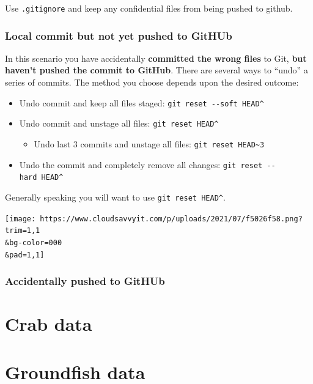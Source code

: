 \documentclass[
]{book}
\providecommand{\tightlist}{%
  \setlength{\itemsep}{0pt}\setlength{\parskip}{0pt}}
\begin{document}
Use \texttt{.gitignore} and keep any confidential files from being pushed to github.

\hypertarget{local-commit-but-not-yet-pushed-to-github}{%
\subsubsection{Local commit but not yet pushed to GitHUb}\label{local-commit-but-not-yet-pushed-to-github}}

In this scenario you have accidentally \textbf{committed the wrong files} to Git, \textbf{but haven't pushed the commit to GitHub}.
There are several ways to ``undo'' a series of commits.
The method you choose depends upon the desired outcome:

\begin{itemize}
\tightlist
\item
  Undo commit and keep all files staged: \texttt{git\ reset\ -\/-soft\ HEAD\^{}}
\item
  Undo commit and unstage all files: \texttt{git\ reset\ HEAD\^{}}

  \begin{itemize}
  \tightlist
  \item
    Undo last 3 commits and unstage all files: \texttt{git\ reset\ HEAD\textasciitilde{}3}
  \end{itemize}
\item
  Undo the commit and completely remove all changes: \texttt{git\ reset\ -\/-hard\ HEAD\^{}}
\end{itemize}

Generally speaking you will want to use \texttt{git\ reset\ HEAD\^{}}.

\texttt{[image: https://www.cloudsavvyit.com/p/uploads/2021/07/f5026f58.png?trim=1,1\\\&bg-color=000\\\&pad=1,1]}

\hypertarget{accidentally-pushed-to-github}{%
\subsubsection{Accidentally pushed to GitHUb}\label{accidentally-pushed-to-github}}

\hypertarget{crab-data}{%
\section{Crab data}\label{crab-data}}

\hypertarget{groundfish-data}{%
\section{Groundfish data}\label{groundfish-data}}
\end{document}
